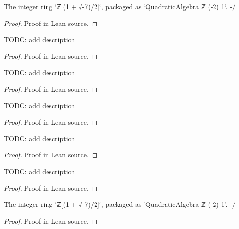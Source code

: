 \begin{definition}[quot]
  \label{def:quot}
  \leanok
  The integer ring `ℤ[(1 + √-7)/2]`, packaged as `QuadraticAlgebra ℤ (-2) 1`. -/
\end{definition}
\begin{proof}\leanok
  Proof in Lean source.
\end{proof}

\begin{lemma}
  \label{lem:quot_mul_add_rem_eq}
  \leanok
  TODO: add description
\end{lemma}
\begin{proof}\leanok
  Proof in Lean source.
\end{proof}

\begin{definition}[rem]
  \label{def:rem}
  \leanok
  TODO: add description
\end{definition}
\begin{proof}\leanok
  Proof in Lean source.
\end{proof}

\begin{lemma}
  \label{lem:theta'_irreducible}
  \leanok
  TODO: add description
\end{lemma}
\begin{proof}\leanok
  Proof in Lean source.
\end{proof}

\begin{lemma}
  \label{lem:theta'_prime}
  \leanok
  TODO: add description
\end{lemma}
\begin{proof}\leanok
  Proof in Lean source.
\end{proof}

\begin{lemma}
  \label{lem:theta_irreducible}
  \leanok
  TODO: add description
\end{lemma}
\begin{proof}\leanok
  Proof in Lean source.
\end{proof}

\begin{lemma}
  \label{lem:theta_pow_dvd_of_coprime_prod}
  \leanok
  The integer ring `ℤ[(1 + √-7)/2]`, packaged as `QuadraticAlgebra ℤ (-2) 1`. -/
\end{lemma}
\begin{proof}\leanok
  Proof in Lean source.
\end{proof}

